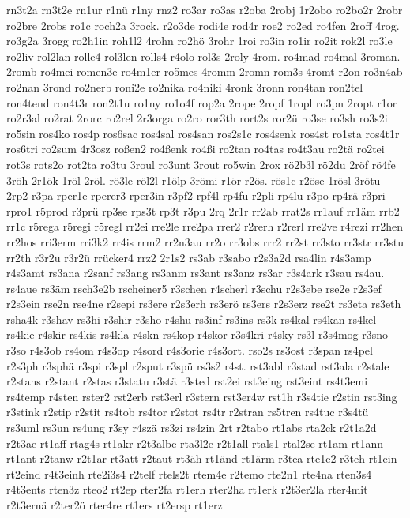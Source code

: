 {rn3t2a
rn3t2e
rn1ur
r1nü
r1ny
rnz2
ro3ar
ro3as
r2oba
2robj
1r2obo
ro2bo2r
2robr
ro2bre
2robs
ro1c
roch2a
3rock.
r2o3de
rodi4e
rod4r
roe2
ro2ed
ro4fen
2roff
4rog.
ro3g2a
3rogg
ro2h1in
roh1l2
4rohn
ro2hö
3rohr
1roi
ro3in
ro1ir
ro2it
rok2l
ro3le
ro2liv
rol2lan
rolle4
rol3len
rolls4
r4olo
rol3s
2roly
4rom.
ro4mad
ro4mal
3roman.
2romb
ro4mei
romen3e
ro4m1er
ro5mes
4romm
2romn
rom3s
4romt
r2on
ro3n4ab
ro2nan
3rond
ro2nerb
roni2e
ro2nika
ro4niki
4ronk
3ronn
ron4tan
ron2tel
ron4tend
ron4t3r
ron2t1u
ro1ny
ro1o4f
rop2a
2rope
2ropf
1ropl
ro3pn
2ropt
r1or
ro2r3al
ro2rat
2rorc
ro2rel
2r3orga
ro2ro
ror3th
rort2s
ror2ü
ro3se
ro3sh
ro3s2i
ro5sin
ros4ko
ros4p
ros6sac
ros4sal
ros4san
ros2s1c
ros4senk
ros4st
ro1sta
ros4t1r
ros6tri
ro2sum
4r3osz
roßen2
ro4ßenk
ro4ßi
ro2tan
ro4tas
ro4t3au
ro2tä
ro2tei
rot3s
rots2o
rot2ta
ro3tu
3roul
ro3unt
3rout
ro5win
2rox
rö2b3l
rö2du
2röf
rö4fe
3röh
2r1ök
1röl
2röl.
rö3le
röl2l
r1ölp
3römi
r1ör
r2ös.
rös1c
r2öse
1rösl
3rötu
2rp2
r3pa
rper1e
rperer3
rper3in
r3pf2
rpf4l
rp4fu
r2pli
rp4lu
r3po
rp4rä
r3pri
rpro1
r5prod
r3prü
rp3se
rps3t
rp3t
r3pu
2rq
2r1r
rr2ab
rrat2s
rr1auf
rr1äm
rrb2
rr1c
r5rega
r5regi
r5regl
rr2ei
rre2le
rre2pa
rrer2
r2rerh
r2rerl
rre2ve
r4rezi
rr2hen
rr2hos
rri3erm
rri3k2
rr4is
rrm2
rr2n3au
rr2o
rr3obs
rrr2
rr2st
rr3sto
rr3str
rr3stu
rr2th
r3r2u
r3r2ü
rrücker4
rrz2
2r1s2
rs3ab
r3sabo
r2s3a2d
rsa4lin
r4s3amp
r4s3amt
rs3ana
r2sanf
rs3ang
rs3anm
rs3ant
rs3anz
rs3ar
r3s4ark
r3sau
rs4au.
rs4aue
rs3äm
rsch3e2b
rscheiner5
r3schen
r4scherl
r3schu
r2s3ebe
rse2e
r2s3ef
r2s3ein
rse2n
rse4ne
r2sepi
rs3ere
r2s3erh
rs3erö
rs3ers
r2s3erz
rse2t
rs3eta
rs3eth
rsha4k
r3shav
rs3hi
r3shir
r3sho
r4shu
rs3inf
rs3ins
rs3k
rs4kal
rs4kan
rs4kel
rs4kie
r4skir
rs4kis
rs4kla
r4skn
rs4kop
r4skor
r3s4kri
r4sky
rs3l
r3s4mog
r3sno
r3so
r4s3ob
rs4om
r4s3op
r4sord
r4s3orie
r4s3ort.
rso2s
rs3ost
r3span
rs4pel
r2s3ph
r3sphä
r3spi
r3spl
r2sput
r3spü
rs3s2
r4st.
rst3abl
r3stad
rst3ala
r2stale
r2stans
r2stant
r2stas
r3statu
r3stä
r3sted
rst2ei
rst3eing
rst3eint
rs4t3emi
rs4temp
r4sten
rster2
rst2erb
rst3erl
r3stern
rst3er4w
rst1h
r3s4tie
r2stin
rst3ing
r3stink
r2stip
r2stit
rs4tob
rs4tor
r2stot
rs4tr
r2stran
rs5tren
rs4tuc
r3s4tü
rs3uml
rs3un
rs4ung
r3sy
r4szä
rs3zi
rs4zin
2rt
r2tabo
rt1abs
rta2ck
r2t1a2d
r2t3ae
rt1aff
rtag4s
rt1akr
r2t3albe
rta3l2e
r2t1all
rtals1
rtal2se
rt1am
rt1ann
rt1ant
r2tanw
r2t1ar
rt3att
r2taut
rt3äh
rt1änd
rt1ärm
r3tea
rte1e2
r3teh
rt1ein
rt2eind
r4t3einh
rte2i3s4
r2telf
rtels2t
rtem4e
r2temo
rte2n1
rte4na
rten3s4
r4t3ents
rten3z
rteo2
rt2ep
rter2fa
rt1erh
rter2ha
rt1erk
r2t3er2la
rter4mit
r2t3ernä
r2ter2ö
rter4re
rt1ers
rt2ersp
rt1erz
}
